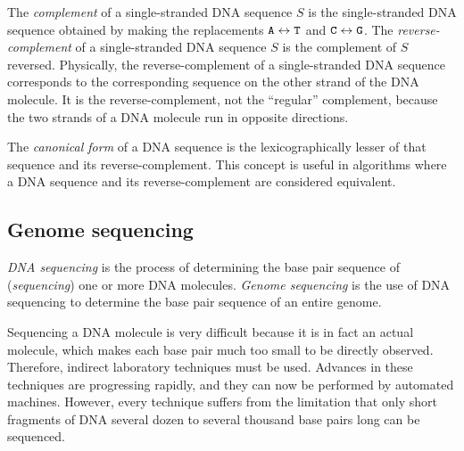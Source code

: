\documentclass[10pt]{article}
\newcommand\Base[1]{{\tt #1}}
\newcommand{\KeyTerm}[1]{{\it #1}}
\begin{document}
The \KeyTerm{complement} of a single-stranded DNA sequence $S$ is the
single-stranded DNA sequence obtained by making the replacements $\Base{A}
\leftrightarrow \Base{T}$ and $\Base{C} \leftrightarrow \Base{G}$.  The
\KeyTerm{reverse-complement} of a single-stranded DNA sequence $S$ is the
complement of $S$ reversed.  Physically, the reverse-complement of a
single-stranded DNA sequence corresponds to the corresponding sequence on the
other strand of the DNA molecule.  It is the reverse-complement, not the
``regular'' complement, because the two strands of a DNA molecule run in
opposite directions.

The \KeyTerm{canonical form} of a DNA sequence is the lexicographically lesser
of that sequence and its reverse-complement.  This concept is useful in
algorithms where a DNA sequence and its reverse-complement are considered
equivalent.

\subsection{Genome sequencing}

\KeyTerm{DNA sequencing} is the process of determining the base pair sequence of
(\KeyTerm{sequencing}) one or more DNA molecules.  \KeyTerm{Genome sequencing}
is the use of DNA sequencing to determine the base pair sequence of an entire
genome.

Sequencing a DNA molecule is very difficult because it is in fact an actual
molecule, which makes each base pair much too small to be directly observed.
Therefore, indirect laboratory techniques must be used.  Advances in these
techniques are progressing rapidly, and they can now be performed by automated
machines.  However, every technique suffers from the limitation that only short
fragments of DNA several dozen to several thousand base pairs long can be
sequenced.
\end{document}
